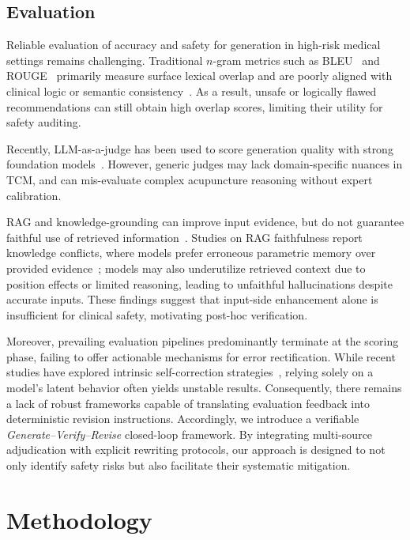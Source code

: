 \documentclass[preprint,5p,times,twocolumn,fleqn]{elsarticle}
\begin{document}
\subsection{Evaluation}
Reliable evaluation of accuracy and safety for generation in high-risk medical settings remains challenging. Traditional $n$-gram metrics such as BLEU~\citep{papineni_bleu_2002} and ROUGE~\citep{in_rouge_2004} primarily measure surface lexical overlap and are poorly aligned with clinical logic or semantic consistency~\citep{li_chatdoctor_2023}. As a result, unsafe or logically flawed recommendations can still obtain high overlap scores, limiting their utility for safety auditing.

Recently, LLM-as-a-judge has been used to score generation quality with strong foundation models~\citep{li_chatdoctor_2023,zheng2023mtbench,liu_geval_2023}. However, generic judges may lack domain-specific nuances in TCM, and can mis-evaluate complex acupuncture reasoning without expert calibration.

RAG and knowledge-grounding can improve input evidence, but do not guarantee faithful use of retrieved information~\citep{wang_knowledge-tuning_2025}. Studies on RAG faithfulness report knowledge conflicts, where models prefer erroneous parametric memory over provided evidence~\citep{shi_trusting_2023,liu_lost_middle_2023}; models may also underutilize retrieved context due to position effects or limited reasoning, leading to unfaithful hallucinations despite accurate inputs. These findings suggest that input-side enhancement alone is insufficient for clinical safety, motivating post-hoc verification.

Moreover, prevailing evaluation pipelines predominantly terminate at the scoring phase, failing to offer actionable mechanisms for error rectification. While recent studies have explored intrinsic self-correction strategies~\citep{madaan_self_refine_2023,gao_rarr_2023}, relying solely on a model's latent behavior often yields unstable results. Consequently, there remains a lack of robust frameworks capable of translating evaluation feedback into deterministic revision instructions. Accordingly, we introduce a verifiable \textit{Generate--Verify--Revise} closed-loop framework. By integrating multi-source adjudication with explicit rewriting protocols, our approach is designed to not only identify safety risks but also facilitate their systematic mitigation.

\section{Methodology}
\label{sec:methodology}
\end{document}
